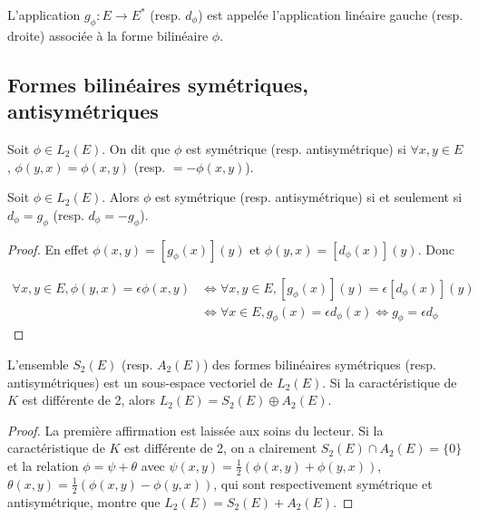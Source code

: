 \begin{de}
L'application $g_\phi : E \rightarrow E^*$ (resp. $d_\phi$) est appelée l'application linéaire gauche (resp. droite) associée à la forme bilinéaire $\phi$.
\end{de}

\subsection{Formes bilinéaires symétriques, antisymétriques}

\begin{de}
Soit $\phi \in L_2(E)$. On dit que $\phi$ est symétrique (resp. antisymétrique) si $\forall x,y \in E$, $\phi(y,x) = \phi(x,y)$ (resp. $= -\phi(x,y)$).
\end{de}

\begin{prop}
Soit $\phi \in L_2(E)$. Alors $\phi$ est symétrique (resp. antisymétrique) si et seulement si $d_\phi = g_\phi$ (resp. $d_\phi = -g_\phi$).
\end{prop}

\begin{proof}
En effet $\phi(x,y) = [g_\phi(x)](y)$ et $\phi(y,x) = [d_\phi(x)](y)$. Donc

\begin{align*}
\forall x,y \in E, \phi(y,x) = \epsilon \phi(x,y) &\Leftrightarrow \forall x,y \in E, [g_\phi(x)](y) = \epsilon [d_\phi(x)](y) \\
&\Leftrightarrow \forall x \in E, g_\phi(x) = \epsilon d_\phi(x) \Leftrightarrow g_\phi = \epsilon d_\phi
\end{align*}
\end{proof}

\begin{prop}
L'ensemble $S_2(E)$ (resp. $A_2(E)$) des formes bilinéaires symétriques (resp. antisymétriques) est un sous-espace vectoriel de $L_2(E)$. Si la caractéristique de $K$ est différente de 2, alors $L_2(E) = S_2(E) \oplus A_2(E)$.
\end{prop}

\begin{proof}
La première affirmation est laissée aux soins du lecteur. Si la caractéristique de $K$ est différente de 2, on a clairement $S_2(E) \cap A_2(E) = \{0\}$ et la relation $\phi = \psi + \theta$ avec $\psi(x,y) = \frac{1}{2}(\phi(x,y) + \phi(y,x))$, $\theta(x,y) = \frac{1}{2}(\phi(x,y) - \phi(y,x))$, qui sont respectivement symétrique et antisymétrique, montre que $L_2(E) = S_2(E) + A_2(E)$.
\end{proof}


